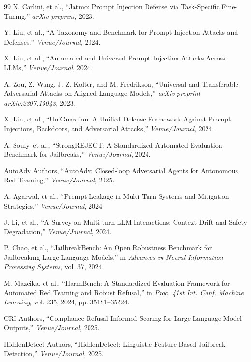 \documentclass[conference]{IEEEtran}
\begin{document}
\begin{thebibliography}{99}
N. Carlini, et al., ``Jatmo: Prompt Injection Defense via Task-Specific Fine-Tuning,'' \textit{arXiv preprint}, 2023.

Y. Liu, et al., ``A Taxonomy and Benchmark for Prompt Injection Attacks and Defenses,'' \textit{Venue/Journal}, 2024.

X. Liu, et al., ``Automated and Universal Prompt Injection Attacks Across LLMs,'' \textit{Venue/Journal}, 2024.

A. Zou, Z. Wang, J. Z. Kolter, and M. Fredrikson, ``Universal and Transferable Adversarial Attacks on Aligned Language Models,'' \textit{arXiv preprint arXiv:2307.15043}, 2023.

X. Lin, et al., ``UniGuardian: A Unified Defense Framework Against Prompt Injections, Backdoors, and Adversarial Attacks,'' \textit{Venue/Journal}, 2024.

A. Souly, et al., ``StrongREJECT: A Standardized Automated Evaluation Benchmark for Jailbreaks,'' \textit{Venue/Journal}, 2024.

AutoAdv Authors, ``AutoAdv: Closed-loop Adversarial Agents for Autonomous Red-Teaming,'' \textit{Venue/Journal}, 2025.

A. Agarwal, et al., ``Prompt Leakage in Multi-Turn Systems and Mitigation Strategies,'' \textit{Venue/Journal}, 2024.

J. Li, et al., ``A Survey on Multi-turn LLM Interactions: Context Drift and Safety Degradation,'' \textit{Venue/Journal}, 2024.

P. Chao, et al., ``JailbreakBench: An Open Robustness Benchmark for Jailbreaking Large Language Models,'' in \textit{Advances in Neural Information Processing Systems}, vol. 37, 2024.

M. Mazeika, et al., ``HarmBench: A Standardized Evaluation Framework for Automated Red Teaming and Robust Refusal,'' in \textit{Proc. 41st Int. Conf. Machine Learning}, vol. 235, 2024, pp. 35181--35224.

CRI Authors, ``Compliance-Refusal-Informed Scoring for Large Language Model Outputs,'' \textit{Venue/Journal}, 2025.

HiddenDetect Authors, ``HiddenDetect: Linguistic-Feature-Based Jailbreak Detection,'' \textit{Venue/Journal}, 2025.

\end{thebibliography}
\end{document}
